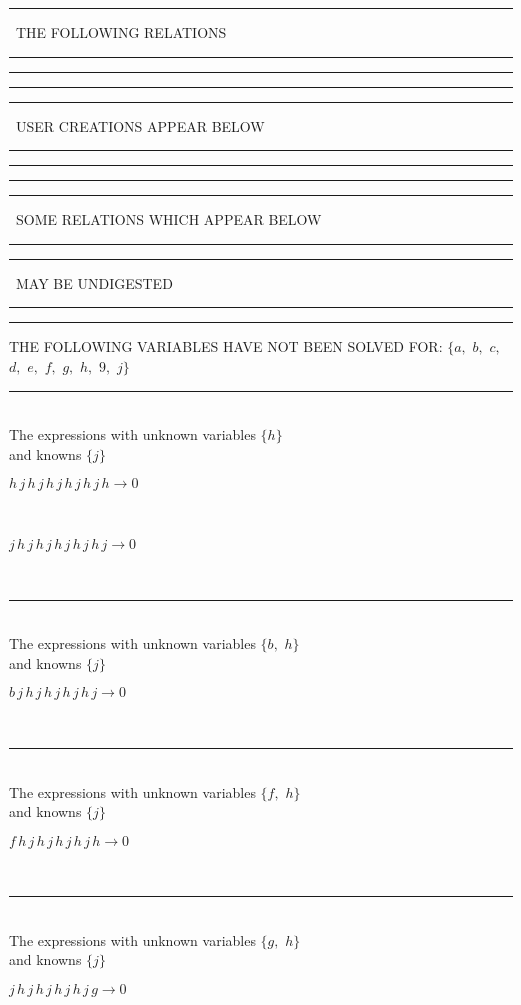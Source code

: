 \rule[2pt]{1.923in}{4pt}
\ THE FOLLOWING RELATIONS\ 
\rule[2pt]{1.923in}{4pt}\hfil\break
\rule[2pt]{6in}{4pt}\hfil\break
\rule[2pt]{6in}{1pt}\hfil\break
\rule[2.5pt]{1.701in}{1pt}
\ USER CREATIONS APPEAR BELOW\ 
\rule[2.5pt]{1.701in}{1pt}\hfil\break
\rule[2pt]{6in}{1pt}\hfil\break
\rule[2pt]{6in}{4pt}\hfil\break
\rule[2pt]{1.45in}{4pt}
\ SOME RELATIONS WHICH APPEAR BELOW\ 
\rule[2pt]{1.45in}{4pt}\hfil\break
\rule[2pt]{2.18in}{4pt}
\ MAY BE UNDIGESTED\ 
\rule[2pt]{2.18in}{4pt}\hfil\break
\rule[2pt]{6in}{4pt}\hfil\break
THE FOLLOWING VARIABLES HAVE NOT BEEN SOLVED FOR:\hfil\break
$\{a,
$ $
b,
$ $
c,
$ $
d,
$ $
e,
$ $
f,
$ $
g,
$ $
h,
$ $
9,
$ $
j\}$
\smallskip\\
\rule[3pt]{6in}{.7pt}\\
The expressions with unknown variables $\{h\}$\\
and knowns $\{j\}$\smallskip\\
\begin{minipage}{6in}
$
h\,
 j\,
 h\,
 j\,
 h\,
 j\,
 h\,
 j\,
 h\,
 j\,
 h\rightarrow 0
$
\end{minipage}\medskip \\
\begin{minipage}{6in}
$
j\,
 h\,
 j\,
 h\,
 j\,
 h\,
 j\,
 h\,
 j\,
 h\,
 j\rightarrow 0
$
\end{minipage}\\
\rule[3pt]{6in}{.7pt}\\
The expressions with unknown variables $\{b,
$ $
h\}$\\
and knowns $\{j\}$\smallskip\\
\begin{minipage}{6in}
$
b\,
 j\,
 h\,
 j\,
 h\,
 j\,
 h\,
 j\,
 h\,
 j\rightarrow 0
$
\end{minipage}\\
\rule[3pt]{6in}{.7pt}\\
The expressions with unknown variables $\{f,
$ $
h\}$\\
and knowns $\{j\}$\smallskip\\
\begin{minipage}{6in}
$
f\,
 h\,
 j\,
 h\,
 j\,
 h\,
 j\,
 h\,
 j\,
 h\rightarrow 0
$
\end{minipage}\\
\rule[3pt]{6in}{.7pt}\\
The expressions with unknown variables $\{g,
$ $
h\}$\\
and knowns $\{j\}$\smallskip\\
\begin{minipage}{6in}
$
j\,
 h\,
 j\,
 h\,
 j\,
 h\,
 j\,
 h\,
 j\,
 g\rightarrow 0
$
\end{minipage}\\
